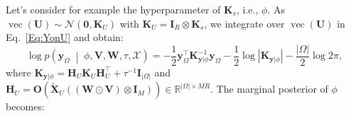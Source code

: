 \documentclass[12pt]{article}
\newcommand{\given}{\;\middle|\;}
\newcommand{\bd}[1]{\boldsymbol{#1}}
\begin{document}
Let's consider for example the hyperparameter of $\boldsymbol{K}_s$, i.e., $\phi$. As $\operatorname{vec}(\boldsymbol{U})\sim\mathcal{N}(\boldsymbol{0},\boldsymbol{K}_{U})$ with  $\boldsymbol{K}_{U}=\boldsymbol{I}_{R}\otimes\boldsymbol{K}_s$, we integrate over $\operatorname{vec}(\boldsymbol{U})$ in Eq.~\eqref{Eq:YonU} and obtain:
\begin{equation}
    \log{p\left(\boldsymbol{y}_{\Omega}\given\phi,\boldsymbol{V},\boldsymbol{W},\tau,\boldsymbol{\mathcal{X}}\right)}=-\frac{1}{2}\boldsymbol{y}_{\Omega}^{\top}\boldsymbol{K}_{\left.\boldsymbol{y}\right|\phi}^{-1}\boldsymbol{y}_{\Omega}-\frac{1}{2}\log{\left|\boldsymbol{K}_{\left.\boldsymbol{y}\right|\phi}\right|}-\frac{|\Omega|}{2}\log{2\pi},
\end{equation}
where $\boldsymbol{K}_{\left.\boldsymbol{y}\right|\phi}=\boldsymbol{H}_{U}\boldsymbol{K}_{U}\boldsymbol{H}_{U}^{\top}+\tau^{-1}\boldsymbol{I}_{|\Omega|}$ and $\boldsymbol{H}_{U}=\boldsymbol{O}\left(\tilde{\bd{X}}_{U}\left((\boldsymbol{W}\odot\boldsymbol{V})\otimes\boldsymbol{I}_{M}\right)\right)\in\mathbb{R}^{|\Omega|\times MR}$.
The marginal posterior of $\phi$ becomes:
\end{document}
